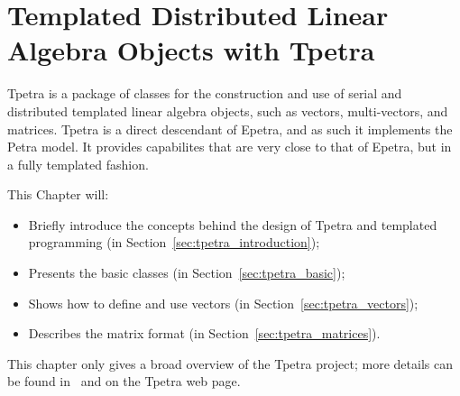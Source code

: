 % 
% 
% 
%  
%  
% 

\chapter{Templated Distributed Linear Algebra Objects with Tpetra}
\label{chap:tpetra}


\begin{introchapter}
Tpetra is a package of classes for the construction and use of serial and
distributed templated linear algebra objects, such as vectors, multi-vectors,
and matrices. 
Tpetra is a direct
descendant of Epetra, and as such it implements the Petra model.  
It provides capabilites that are very close to that of Epetra, but in a fully
templated fashion.

This Chapter will:
\begin{itemize}
\itemsep=1pt
\item Briefly introduce the concepts behind the design of Tpetra and
templated programming (in Section~\ref{sec:tpetra_introduction});
\item Presents the basic classes (in Section~\ref{sec:tpetra_basic});
\item Shows how to define and use vectors (in Section~\ref{sec:tpetra_vectors});
\item Describes the matrix format (in Section~\ref{sec:tpetra_matrices}).
\end{itemize}

This chapter only gives a broad overview of the Tpetra project; more details
can be found in~\cite{tpetra_overview} and on the Tpetra web page.
\end{introchapter}


